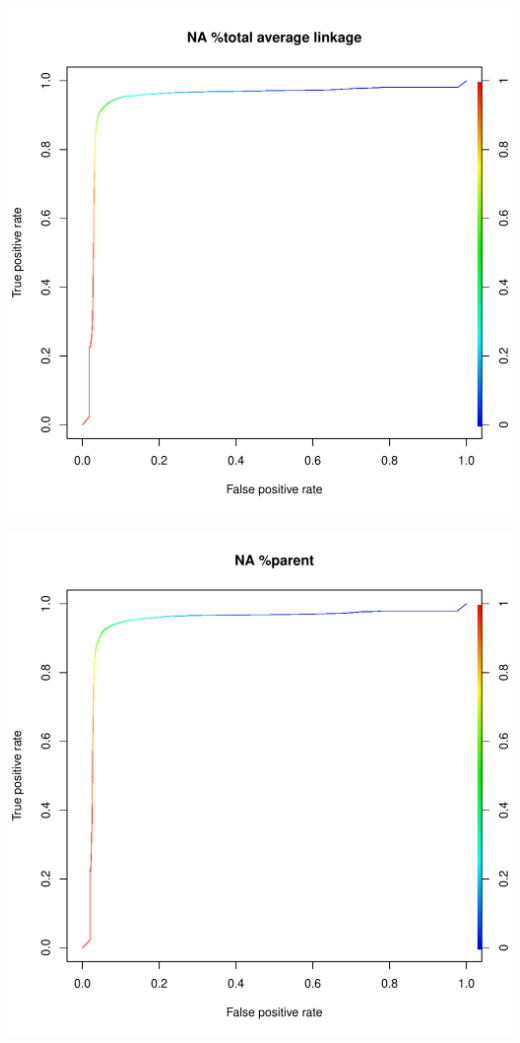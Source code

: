 \documentclass[11pt,a4paper,twoside]{report}\usepackage[]{graphicx}\usepackage[]{color}
\makeatletter
\def\maxwidth{ %
  \ifdim\Gin@nat@width>\linewidth
    \linewidth
  \else
    \Gin@nat@width
  \fi
}
\newenvironment{knitrout}{}{} %
\makeatother
\begin{document}
\begin{knitrout}
\includegraphics[width=\maxwidth]{figure/fig_code-23} 

\includegraphics[width=\maxwidth]{figure/fig_code-24} 


\end{knitrout}
\end{document}
